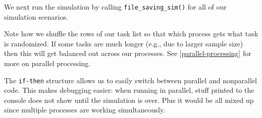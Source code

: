 \documentclass[
]{book}
\newenvironment{Shaded}{\begin{snugshade}}{\end{snugshade}}
\newcommand{\AttributeTok}[1]{\textcolor[rgb]{0.13,0.29,0.53}{#1}}
\newcommand{\CommentTok}[1]{\textcolor[rgb]{0.56,0.35,0.01}{\textit{#1}}}
\newcommand{\ConstantTok}[1]{\textcolor[rgb]{0.56,0.35,0.01}{#1}}
\newcommand{\ControlFlowTok}[1]{\textcolor[rgb]{0.13,0.29,0.53}{\textbf{#1}}}
\newcommand{\DecValTok}[1]{\textcolor[rgb]{0.00,0.00,0.81}{#1}}
\newcommand{\FunctionTok}[1]{\textcolor[rgb]{0.13,0.29,0.53}{\textbf{#1}}}
\newcommand{\NormalTok}[1]{#1}
\newcommand{\OtherTok}[1]{\textcolor[rgb]{0.56,0.35,0.01}{#1}}
\newcommand{\SpecialCharTok}[1]{\textcolor[rgb]{0.81,0.36,0.00}{\textbf{#1}}}
\begin{document}
We next run the simulation by calling \texttt{file\_saving\_sim()} for all of our simulation scenarios.

\begin{Shaded}
\end{Shaded}

Note how we shuffle the rows of our task list so that which process gets what task is randomized.
If some tasks are much longer (e.g., due to larger sample size) then this will get balanced out across our processes.
See \ref{parallel-processing} for more on parallel processing.

The \texttt{if-then} structure allows us to easily switch between parallel and nonparallel code.
This makes debugging easier: when running in parallel, stuff printed to the console does not show until the simulation is over.
Plus it would be all mixed up since multiple processes are working simultaneously.
\end{document}
